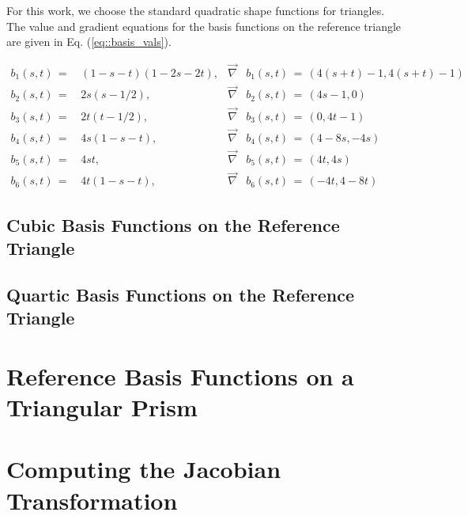 \documentclass[11pt]{article}
\begin{document}
For this work, we choose the standard quadratic shape functions for triangles. The value and gradient equations for the basis functions on the reference triangle are given in Eq. (\ref{eq::basis_vals}).

\begin{equation}
	\begin{aligned}
		b_1(s,t) \, =& \, (1-s-t) (1-2s-2t),  &\vec{\nabla}& b_1(s,t) \, = \, \left( 4(s+t)-1 , 4(s+t)-1   \right) \\
		b_2(s,t) \, =& \, 2s(s-1/2),             &\vec{\nabla}& b_2(s,t) \, = \, \left( 4s-1, 0   \right) \\
		b_3(s,t) \, =& \, 2t(t-1/2),              &\vec{\nabla}& b_3(s,t) \, = \, \left( 0, 4t-1   \right) \\
		b_4(s,t) \, =& \, 4s (1-s-t),             &\vec{\nabla}& b_4(s,t) \, = \, \left( 4-8s, -4s   \right) \\
		b_5(s,t) \, =& \, 4st,                       &\vec{\nabla}& b_5(s,t) \, = \, \left( 4t, 4s   \right) \\
		b_6(s,t) \, =& \, 4t (1-s-t),             &\vec{\nabla}& b_6(s,t) \, = \, \left( -4t, 4-8t   \right) 
	\end{aligned}
\label{eq::basis_vals}
\end{equation}

\subsection{Cubic Basis Functions on the Reference Triangle}
\label{sec::triref_cubic}

\subsection{Quartic Basis Functions on the Reference Triangle}
\label{sec::triref_quartic}

\section{Reference Basis Functions on a Triangular Prism}
\label{sec::triprismref}

\section{Computing the Jacobian Transformation}
\label{sec::jacobian}
\end{document}
